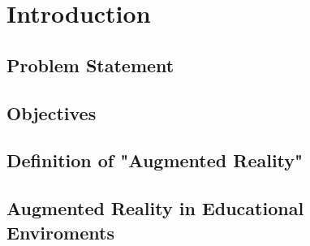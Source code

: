 \section{Introduction}
\subsection{Problem Statement}
\subsection{Objectives}
\subsection{Definition of "Augmented Reality"}
\subsection{Augmented Reality in Educational Enviroments}